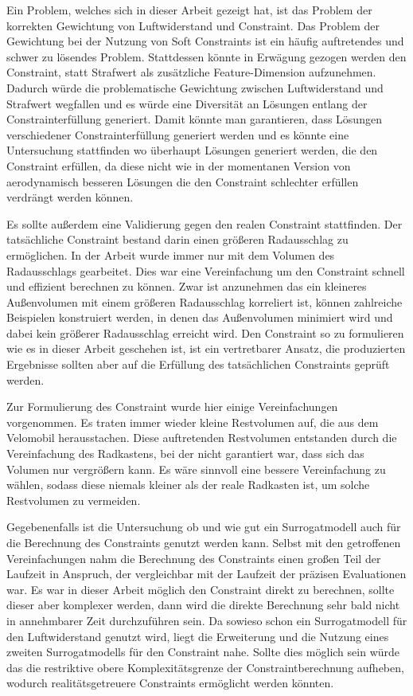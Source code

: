 Ein Problem, welches sich in dieser Arbeit gezeigt hat, ist das Problem der korrekten Gewichtung von Luftwiderstand und Constraint.
Das Problem der Gewichtung bei der Nutzung von Soft Constraints ist ein häufig auftretendes und schwer zu lösendes Problem.
Stattdessen könnte in Erwägung gezogen werden den Constraint, statt Strafwert als zusätzliche Feature-Dimension aufzunehmen.
Dadurch würde die problematische Gewichtung zwischen Luftwiderstand und Strafwert wegfallen und es würde eine Diversität an Lösungen entlang der Constrainterfüllung generiert.
Damit könnte man garantieren, dass Lösungen verschiedener Constrainterfüllung generiert werden und es könnte eine Untersuchung stattfinden wo überhaupt Lösungen generiert werden, die den Constraint erfüllen, da diese nicht wie in der momentanen Version von aerodynamisch besseren Lösungen die den Constraint schlechter erfüllen verdrängt werden können.

Es sollte außerdem eine Validierung gegen den realen Constraint stattfinden.
Der tatsächliche Constraint bestand darin einen größeren Radausschlag zu ermöglichen.
In der Arbeit wurde immer nur mit dem Volumen des Radausschlags gearbeitet.
Dies war eine Vereinfachung um den Constraint schnell und effizient berechnen zu können.
Zwar ist anzunehmen das ein kleineres Außenvolumen mit einem größeren Radausschlag korreliert ist, können zahlreiche Beispielen konstruiert werden, in denen das Außenvolumen minimiert wird und dabei kein größerer Radausschlag erreicht wird.
Den Constraint so zu formulieren wie es in dieser Arbeit geschehen ist, ist ein vertretbarer Ansatz, die produzierten Ergebnisse sollten aber auf die Erfüllung des tatsächlichen Constraints geprüft werden.

Zur Formulierung des Constraint wurde hier einige Vereinfachungen vorgenommen.
Es traten immer wieder kleine Restvolumen auf, die aus dem Velomobil herausstachen.
Diese auftretenden Restvolumen entstanden durch die Vereinfachung des Radkastens, bei der nicht garantiert war, dass sich das Volumen nur vergrößern kann.
Es wäre sinnvoll eine bessere Vereinfachung zu wählen, sodass diese niemals kleiner als der reale Radkasten ist, um solche Restvolumen zu vermeiden.

Gegebenenfalls ist die Untersuchung ob und wie gut ein Surrogatmodell auch für die Berechnung des Constraints genutzt werden kann.
Selbst mit den getroffenen Vereinfachungen nahm die Berechnung des Constraints einen großen Teil der Laufzeit in Anspruch, der vergleichbar mit der Laufzeit der präzisen Evaluationen war.
Es war in dieser Arbeit möglich den Constraint direkt zu berechnen, sollte dieser aber komplexer werden, dann wird die direkte Berechnung sehr bald nicht in annehmbarer Zeit durchzuführen sein.
Da sowieso schon ein Surrogatmodell für den Luftwiderstand genutzt wird, liegt die Erweiterung und die Nutzung eines zweiten Surrogatmodells für den Constraint nahe.
Sollte dies möglich sein würde das die restriktive obere Komplexitätsgrenze der Constraintberechnung aufheben, wodurch realitätsgetreuere Constraints ermöglicht werden könnten. 

